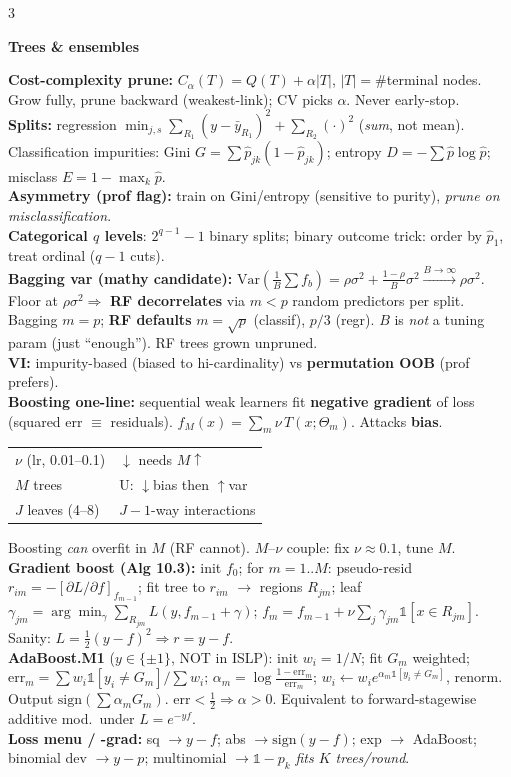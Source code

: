 \documentclass[a4paper,9pt]{extarticle}
\newcommand{\Var}{\mathrm{Var}}
\newcommand{\hd}[1]{\textbf{#1}}
\newcommand{\sect}[1]{\par\vspace{1pt}\noindent\colorbox{black!10}{\parbox{\dimexpr\linewidth-2\fboxsep\relax}{\strut\textbf{#1}\strut}}\par\vspace{1pt}}
\begin{document}
\begin{multicols*}{3}
\sect{Trees \& ensembles}
\hd{Cost-complexity prune:} $C_\alpha(T)=Q(T)+\alpha|T|$, $|T|=$\#terminal nodes. Grow fully, prune backward (weakest-link); CV picks $\alpha$. Never early-stop.\\
\hd{Splits:} regression $\min_{j,s}\sum_{R_1}(y-\bar y_{R_1})^2+\sum_{R_2}(\cdot)^2$ (\emph{sum}, not mean). Classification impurities: Gini $G=\sum\hat p_{jk}(1{-}\hat p_{jk})$; entropy $D=-\sum\hat p\log\hat p$; misclass $E=1-\max_k\hat p$.\\
\hd{Asymmetry (prof flag):} train on Gini/entropy (sensitive to purity), \emph{prune on misclassification}.\\
\hd{Categorical $q$ levels}: $2^{q-1}-1$ binary splits; binary outcome trick: order by $\hat p_1$, treat ordinal ($q{-}1$ cuts).\\
\hd{Bagging var (mathy candidate):}
$\Var(\tfrac1B\sum f_b)=\rho\sigma^2+\tfrac{1-\rho}{B}\sigma^2\xrightarrow{B\to\infty}\rho\sigma^2$.\\
Floor at $\rho\sigma^2\Rightarrow$ \hd{RF decorrelates} via $m<p$ random predictors per split. Bagging $m{=}p$; \hd{RF defaults} $m{=}\sqrt p$ (classif), $p/3$ (regr). $B$ is \emph{not} a tuning param (just ``enough''). RF trees grown unpruned.\\
\hd{VI:} impurity-based (biased to hi-cardinality) vs \hd{permutation OOB} (prof prefers).\\
\hd{Boosting one-line:} sequential weak learners fit \hd{negative gradient} of loss (squared err $\equiv$ residuals). $f_M(x)=\sum_m\nu\,T(x;\Theta_m)$. Attacks \hd{bias}.\par
{\centering\begin{tabular}{@{}l|l@{}}
$\nu$ (lr, 0.01--0.1) & $\downarrow$ needs $M\uparrow$\\
$M$ trees & U: $\downarrow$bias then $\uparrow$var\\
$J$ leaves (4--8) & $J{-}1$-way interactions
\end{tabular}\par}
Boosting \emph{can} overfit in $M$ (RF cannot). $M$--$\nu$ couple: fix $\nu\!\approx\!0.1$, tune $M$.\\
\hd{Gradient boost (Alg 10.3):} init $f_0$; for $m{=}1..M$: pseudo-resid $r_{im}=-[\partial L/\partial f]_{f_{m-1}}$; fit tree to $r_{im}$ $\to$ regions $R_{jm}$; leaf $\gamma_{jm}=\arg\min_\gamma\sum_{R_{jm}}L(y,f_{m-1}+\gamma)$; $f_m=f_{m-1}+\nu\sum_j\gamma_{jm}\mathbb 1[x\in R_{jm}]$. Sanity: $L=\tfrac12(y-f)^2\Rightarrow r=y-f$.\\
\hd{AdaBoost.M1} ($y\!\in\!\{\pm1\}$, NOT in ISLP): init $w_i{=}1/N$; fit $G_m$ weighted; $\mathrm{err}_m=\sum w_i\mathbb 1[y_i\ne G_m]/\sum w_i$; $\alpha_m=\log\!\tfrac{1-\mathrm{err}_m}{\mathrm{err}_m}$; $w_i\!\leftarrow\!w_i e^{\alpha_m\mathbb 1[y_i\ne G_m]}$, renorm. Output $\mathrm{sign}(\sum\alpha_m G_m)$. $\mathrm{err}<\tfrac12\!\Rightarrow\!\alpha>0$. Equivalent to forward-stagewise additive mod.\ under $L=e^{-yf}$.\\
\hd{Loss menu / -grad:} sq $\to y{-}f$; abs $\to\mathrm{sign}(y{-}f)$; exp $\to$ AdaBoost; binomial dev $\to y{-}p$; multinomial $\to\mathbb 1{-}p_k$ \emph{fits $K$ trees/round}.


\end{multicols*}
\end{document}
